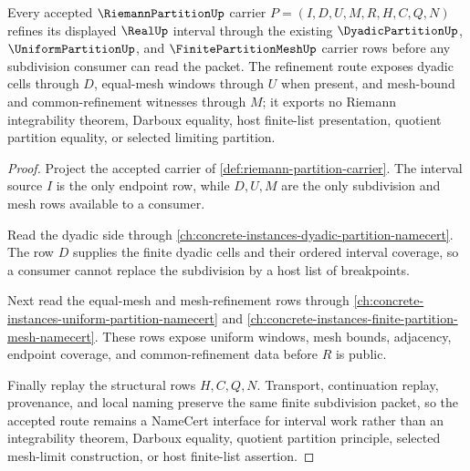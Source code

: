 \begin{theorem}
\label{thm:riemann-partition-mesh-refinement}
Every accepted $\RiemannPartitionUp$ carrier $P=(I,D,U,M,R,H,C,Q,N)$ refines its displayed $\RealUp$ interval through the existing $\DyadicPartitionUp$, $\UniformPartitionUp$, and $\FinitePartitionMeshUp$ carrier rows before any subdivision consumer can read the packet. The refinement route exposes dyadic cells through $D$, equal-mesh windows through $U$ when present, and mesh-bound and common-refinement witnesses through $M$; it exports no Riemann integrability theorem, Darboux equality, host finite-list presentation, quotient partition equality, or selected limiting partition.
\end{theorem}
\begin{proof}
Project the accepted carrier of \autoref{def:riemann-partition-carrier}. The interval source $I$ is the only endpoint row, while $D,U,M$ are the only subdivision and mesh rows available to a consumer.

Read the dyadic side through \autoref{ch:concrete-instances-dyadic-partition-namecert}. The row $D$ supplies the finite dyadic cells and their ordered interval coverage, so a consumer cannot replace the subdivision by a host list of breakpoints.

Next read the equal-mesh and mesh-refinement rows through \autoref{ch:concrete-instances-uniform-partition-namecert} and \autoref{ch:concrete-instances-finite-partition-mesh-namecert}. These rows expose uniform windows, mesh bounds, adjacency, endpoint coverage, and common-refinement data before $R$ is public.

Finally replay the structural rows $H,C,Q,N$. Transport, continuation replay, provenance, and local naming preserve the same finite subdivision packet, so the accepted route remains a NameCert interface for interval work rather than an integrability theorem, Darboux equality, quotient partition principle, selected mesh-limit construction, or host finite-list assertion.
\end{proof}



